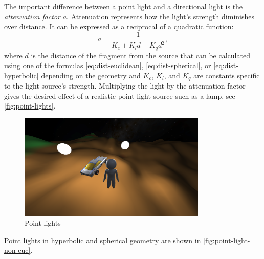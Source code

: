The important difference between a point light and a directional light is the \textit{attenuation factor} $a$.
Attenuation represents how the light's strength diminishes over distance.
It can be expressed as a reciprocal of a quadratic function:
\begin{equation}
    a = \frac{1}{K_c + K_l d + K_q d^2},
\end{equation}
where $d$ is the distance of the fragment from the source that can be calculated using one of the formulas \ref{eq:dist-euclidean}, \ref{eq:dist-spherical}, or \ref{eq:dist-hyperbolic} depending on the geometry and $K_c$, $K_l$, and $K_q$ are constants specific to the light source's strength.
Multiplying the light by the attenuation factor gives the desired effect of a realistic point light source such as a lamp, see \autoref{fig:point-lights}.
\begin{figure}[h]
    \centering
    \includegraphics[width=0.8\textwidth]{chapters/theoretical_foundations/sections/lighting/resources/point-lights.png}
    \caption{Point lights}
    \label{fig:point-lights}
\end{figure}
Point lights in hyperbolic and spherical geometry are shown in \autoref{fig:point-light-non-euc}.
